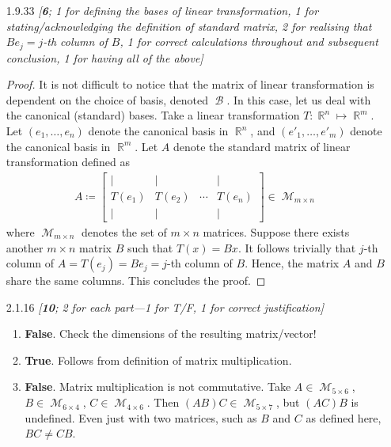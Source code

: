 \documentclass{amsart}
\theoremstyle{definition}
\theoremstyle{definition}
\DeclareMathOperator{\R}{\mathbb{R}}
\DeclareMathOperator{\1}{\mathbbm{1}}
\DeclareMathOperator{\MM}{\mathcal{M}}
\DeclareMathOperator{\B}{\mathcal{B}}
\begin{document}
	\begin{enumerate}[itemsep = 2mm]
		\item[1.9.33] \textit{[\textbf{6}; 1 for defining the bases of linear transformation, 1 for stating/acknowledging the definition of standard matrix, 2 for realising that $B e_j = j$-th column of $B$, 1 for correct calculations throughout and subsequent conclusion, 1 for having all of the above]}
		
		\begin{proof}
			It is not difficult to notice that the matrix of linear transformation is dependent on the choice of basis, denoted $\B$. In this case, let us deal with the canonical (standard) bases. Take a linear transformation $T: \R^n \mapsto \R^m$. Let $(e_1, \dots, e_n)$ denote the canonical basis in $\R^n$, and $(e'_1,\dots,e'_m)$ denote the canonical basis in $\R^m$. Let $A$ denote the standard matrix of linear transformation defined as
			\begin{align*}
			A \coloneqq \begin{bmatrix}
			| & | &  & | \\
			T(e_1) & T(e_2) & \cdots & T(e_n) \\
			| & | &  & | 
			\end{bmatrix} \in \MM_{m \times n}
			\end{align*}
			where $\MM_{m \times n}$ denotes the set of $m \times n$ matrices. Suppose there exists another $m \times n$ matrix $B$ such that $T(x) = Bx$. It follows trivially that $j$-th column of $A = T(e_j) = B e_j = j$-th column of $B$. Hence, the matrix $A$ and $B$ share the same columns. This concludes the proof.
		\end{proof}
		
		
		
		\item[2.1.16] \textit{[\textbf{10}; 2 for each part---1 for T/F, 1 for correct justification]}
		
		\begin{enumerate}
			\item \textbf{False}. Check the dimensions of the resulting matrix/vector!
			
			\item \textbf{True}. Follows from definition of matrix multiplication.
			
			\item \textbf{False}. Matrix multiplication is not commutative. Take $A \in \MM_{5 \times 6}$, $B \in \MM_{6 \times 4}$, $C \in \MM_{4 \times 6}$. Then $(AB)C \in \MM_{5 \times 7}$, but $(AC)B$ is undefined. Even just with two matrices, such as $B$ and $C$ as defined here, $BC \neq CB$.
			

\end{enumerate}
\end{enumerate}
\end{document}
